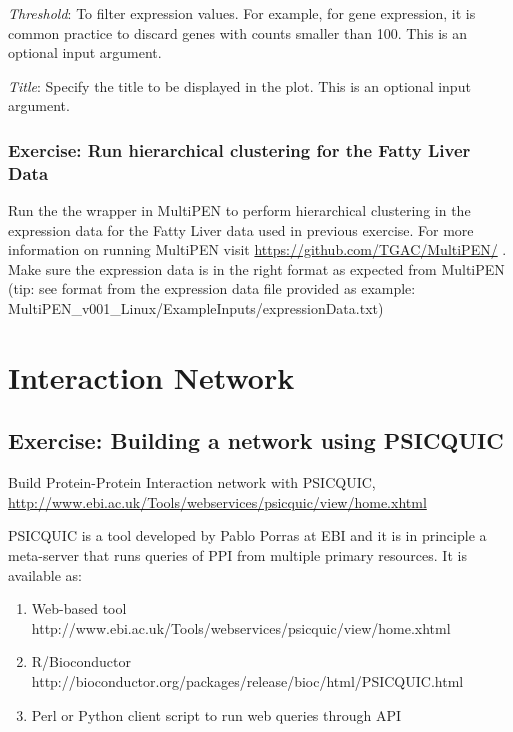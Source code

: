 \documentclass[11pt, oneside]{article}   	%
\begin{document}
{\it Threshold}: To filter expression values. For example, for gene expression, it is common practice to discard genes with counts smaller than 100. This is an optional input argument.

{\it Title}: Specify the title to be displayed in the plot. This is an optional input argument.




\subsubsection{Exercise: Run hierarchical clustering for the Fatty Liver Data \cite{Wruck2015}}

Run the the wrapper in MultiPEN to perform hierarchical clustering in the expression data for the Fatty Liver data \cite{Wruck2015} used in previous exercise. For more information on running MultiPEN visit \url{https://github.com/TGAC/MultiPEN/} \cite{Rey2017}. Make sure the expression data is in the right format as expected from MultiPEN (tip: see format from the expression data file provided as example: MultiPEN\_v001\_Linux/ExampleInputs/expressionData.txt)




\section{Interaction Network}

\subsection{Exercise: Building a network using PSICQUIC}

Build Protein-Protein Interaction network with PSICQUIC, \url{http://www.ebi.ac.uk/Tools/webservices/psicquic/view/home.xhtml}

PSICQUIC is a tool developed by Pablo Porras at EBI and it is in principle a meta-server that runs queries of PPI from multiple primary resources. It is available as:

\begin{enumerate}
   
   \item Web-based tool http://www.ebi.ac.uk/Tools/webservices/psicquic/view/home.xhtml
   
   \item R/Bioconductor http://bioconductor.org/packages/release/bioc/html/PSICQUIC.html
   
   \item Perl or Python client script to run web queries through API

\end{enumerate}
\end{document}
